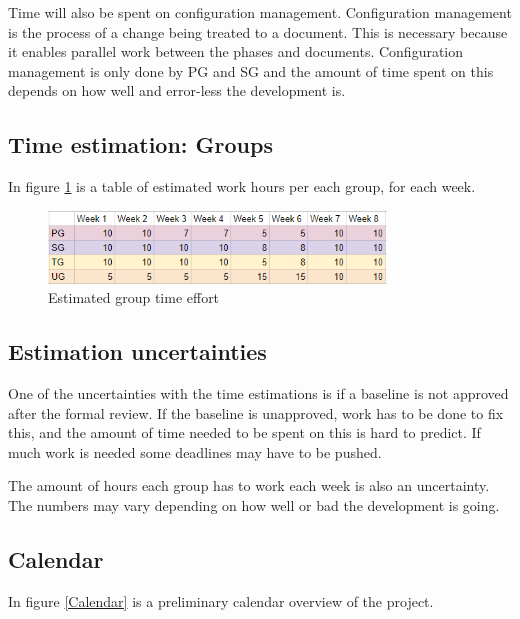\documentclass{article}
\begin{document}
Time will also be spent on configuration management. Configuration management is the process of a change being treated to a document. This is necessary because it enables parallel work between the phases and documents. Configuration management is only done by PG and SG and the amount of time spent on this depends on how well and error-less the development is. 

\subsection{Time estimation: Groups}
In figure \ref{grouph} is a table of estimated work hours per each group, for each week. 

\begin{figure}[h]
\centering\includegraphics[width=0.8\textwidth]{grupptimmar.PNG}
\caption{\label{grouph} Estimated group time effort}
\end{figure}


\subsection{Estimation uncertainties}
One of the uncertainties with the time estimations is if a baseline is not approved after the formal review. If the baseline is unapproved, work has to be done to fix this, and the amount of time needed to be spent on this is hard to predict. If much work is needed some deadlines may have to be pushed. 

The amount of hours each group has to work each week is also an uncertainty. The numbers may vary depending on how well or bad the development is going. 

\subsection{Calendar}
In figure \ref{Calendar} is a preliminary calendar overview of the project.
\end{document}
